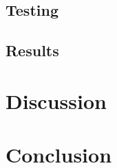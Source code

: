 \documentclass{article}
\begin{document}
\subsection{Testing}

\subsection{Results}

\section{Discussion}


\section{Conclusion}



\end{document}
